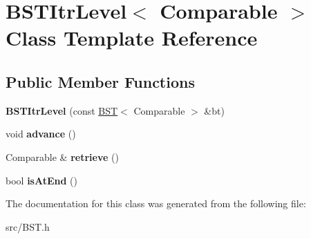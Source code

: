 \hypertarget{singleton_b_s_t_itr_level}{\section{B\+S\+T\+Itr\+Level$<$ Comparable $>$ Class Template Reference}
\label{singleton_b_s_t_itr_level}
}
\subsection*{Public Member Functions}
\begin{DoxyCompactItemize}
\item 
\hypertarget{singleton_b_s_t_itr_level_a8fd5cdde93eb182c4cd5cf6b2c5efaeb}{{\bfseries B\+S\+T\+Itr\+Level} (const \hyperlink{singleton_b_s_t}{B\+S\+T}$<$ Comparable $>$ \&bt)}\label{singleton_b_s_t_itr_level_a8fd5cdde93eb182c4cd5cf6b2c5efaeb}

\item 
\hypertarget{singleton_b_s_t_itr_level_ad54a6fa289a59d6050b507abe40d463b}{void {\bfseries advance} ()}\label{singleton_b_s_t_itr_level_ad54a6fa289a59d6050b507abe40d463b}

\item 
\hypertarget{singleton_b_s_t_itr_level_a0340bd9f21f72ae25348f383e67e7f91}{Comparable \& {\bfseries retrieve} ()}\label{singleton_b_s_t_itr_level_a0340bd9f21f72ae25348f383e67e7f91}

\item 
\hypertarget{singleton_b_s_t_itr_level_a89bc8e81dde255fd6bad917cacc0d489}{bool {\bfseries is\+At\+End} ()}\label{singleton_b_s_t_itr_level_a89bc8e81dde255fd6bad917cacc0d489}

\end{DoxyCompactItemize}


The documentation for this class was generated from the following file\+:\begin{DoxyCompactItemize}
\item 
src/B\+S\+T.\+h\end{DoxyCompactItemize}
